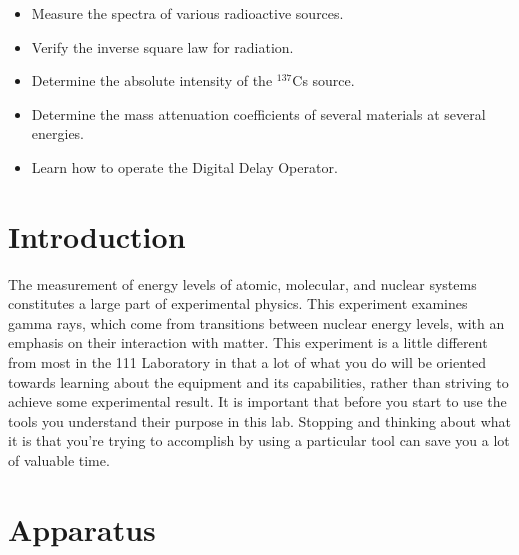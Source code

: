 \documentclass{../lab}
\begin{document}
\begin{itemize}
\begin{itemize}
    \end{itemize}

    \item Measure the spectra of various radioactive sources.

    \item Verify the inverse square law for radiation.

    \item Determine the absolute intensity of the $^{137}$Cs source.

    \item Determine the mass attenuation coefficients of several materials at several energies.

    \item Learn how to operate the Digital Delay Operator.

\end{itemize}

\section{Introduction}

The measurement of energy levels of atomic, molecular, and nuclear systems constitutes a large part of experimental physics. This experiment examines gamma rays, which come from transitions between nuclear energy levels, with an emphasis on their interaction with matter. This experiment is a little different from most in the 111 Laboratory in that a lot of what you do will be oriented towards learning about the equipment and its capabilities, rather than striving to achieve some experimental result. It is important that before you start to use the tools you understand their purpose in this lab. Stopping and thinking about what it is that you're trying to accomplish by using a particular tool can save you a lot of valuable time.

\section{Apparatus}
\end{document}
